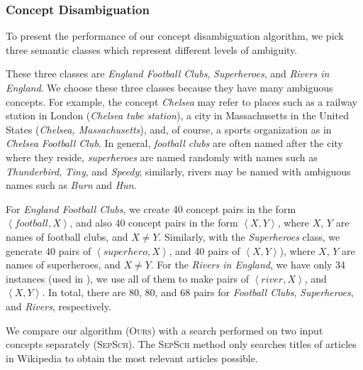 \subsubsection{Concept Disambiguation}

To present the performance of our concept disambiguation algorithm, we
pick three semantic classes which represent different levels of ambiguity.

These three classes are {\em England Football Clubs}, {\em
  Superheroes}, and {\em Rivers in England}. We choose these three
classes because they have many ambiguous concepts. For example, the
concept {\em Chelsea} may refer to places such as a railway station in
London ({\em Chelsea tube station}), a city in Massachusetts in the
United States ({\em Chelsea, Massachusetts}), and, of course, a sports
organization as in {\em Chelsea Football Club}. In general, {\em
  football clubs} are often named after the city where they reside,
{\em superheroes} are named randomly with names such as {\em
  Thunderbird}, {\em Tiny}, and {\em Speedy}; similarly, rivers may be
named with ambiguous names such as {\em Burn} and {\em Hun}.

For {\em England Football Clubs}, we create 40 concept pairs in the
form $\left < football, X \right >$, and also 40 concept pairs in the
form $\left < X, Y \right >$, where $X$, $Y$ are names of football
clubs, and $X \ne Y$. Similarly, with the {\em Superheroes} class, we
generate 40 pairs of $\left < superhero, X \right >$, and 40 pairs of
$\left < X, Y \right >$), where $X$, $Y$ are names of superheroes, and
$X \ne Y$. For the {\em Rivers in England}, we have only 34 instances
(used in \cite{VyasPantel09}), we use all of them to make pairs of
$\left < river, X \right >$, and $\left < X, Y \right >$. In total,
there are 80, 80, and 68 pairs for {\em Football Clubs}, {\em
  Superheroes}, and {\em Rivers}, respectively.

We compare our algorithm (\textsc{Ours}) with a search performed on
two input concepts separately (\textsc{SepSch}). The \textsc{SepSch}
method only searches titles of articles in Wikipedia to obtain the
most relevant articles possible.

